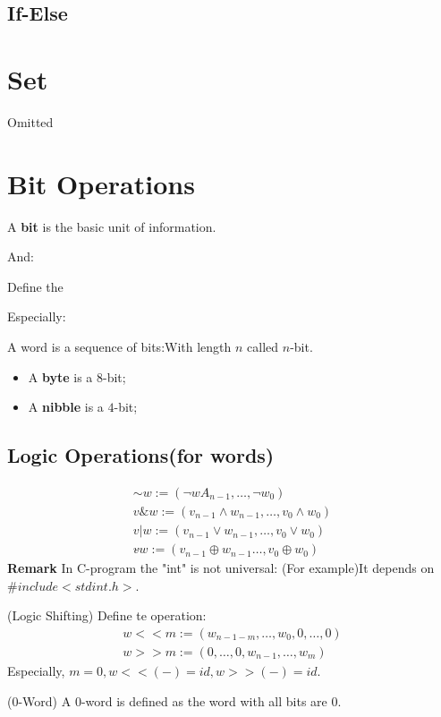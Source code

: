 \documentclass[Total.tex]{subfiles}
\begin{document}
			\subsection{If-Else}
		\section{Set}
			Omitted
		\section{Bit Operations}
			\begin{Def}
				A \textbf{bit} is the basic unit of information. 
			\end{Def}
			And:
			\begin{Def}
				Define the 
			\end{Def}
			Especially:
			\begin{Def}
				A word is a sequence of bits:With length $n$ called $n$-bit.
				\begin{itemize}
					\item A \textbf{byte} is a $8$-bit;
					\item A \textbf{nibble} is a $4$-bit;
				\end{itemize}
			\end{Def}
			\subsection{Logic Operations(for words)}
			\begin{gather*}
				\sim w:=(\neg wA_{n-1},\dots,\neg w_0)\\
				v\&w:=(v_{n-1}\wedge w_{n-1},\dots,v_0\wedge w_0)\\
				v|w:=(v_{n-1}\vee w_{n-1},\dots,v_0\vee w_0)\\
				v\hat{ }w:=(v_{n-1}\oplus w_{n-1}\dots,v_0\oplus w_0)		
			\end{gather*}
			\textbf{Remark} In C-program the "int" is not universal: (For example)It depends on $\#include<stdint.h>$.
			\begin{Def}
				(Logic Shifting) Define te operation:
				\begin{gather*}
					w<<m:=(w_{n-1-m},\dots,w_0,0,\dots,0)\\
					w>>m:=(0,\dots,0,w_{n-1},\dots,w_m)
				\end{gather*}
				Especially, $m=0,w<<(-)=id,w>>(-)=id$.
			\end{Def}
			\begin{Def}
				($0$-Word) A $0$-word is defined as the word with all bits are $0$.
			\end{Def}
\end{document}
